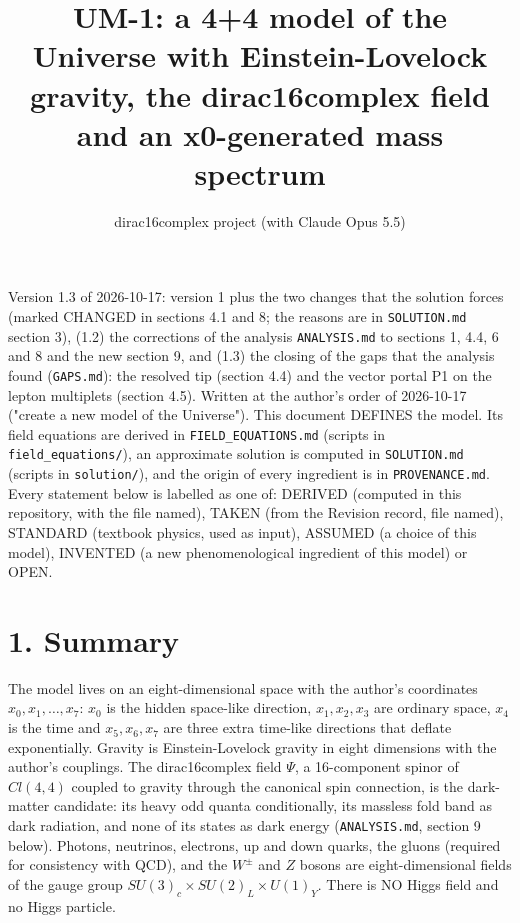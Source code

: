 \documentclass[11pt]{article}
\title{UM-1: a 4+4 model of the Universe with Einstein-Lovelock gravity, the dirac16complex field and an x0-generated mass spectrum}
\author{dirac16complex project (with Claude Opus 5.5)}
\date{}
\begin{document}
\maketitle
\tableofcontents
\newpage

Version 1.3 of 2026-10-17: version 1 plus the two changes that the solution forces (marked CHANGED in sections 4.1 and 8; the reasons are in \texttt{SOLUTION.\allowbreak{}md} section 3), (1.2) the corrections of the analysis \texttt{ANALYSIS.\allowbreak{}md} to sections 1, 4.4, 6 and 8 and the new section 9, and (1.3) the closing of the gaps that the analysis found (\texttt{GAPS.\allowbreak{}md}): the resolved tip (section 4.4) and the vector portal P1 on the lepton multiplets (section 4.5). Written at the author's order of 2026-10-17 ("create a new model of the Universe"). This document DEFINES the model. Its field equations are derived in \texttt{FIELD\_\allowbreak{}EQUATIONS.\allowbreak{}md} (scripts in \texttt{field\_\allowbreak{}equations/\allowbreak{}}), an approximate solution is computed in \texttt{SOLUTION.\allowbreak{}md} (scripts in \texttt{solution/\allowbreak{}}), and the origin of every ingredient is in \texttt{PROVENANCE.\allowbreak{}md}. Every statement below is labelled as one of: DERIVED (computed in this repository, with the file named), TAKEN (from the Revision record, file named), STANDARD (textbook physics, used as input), ASSUMED (a choice of this model), INVENTED (a new phenomenological ingredient of this model) or OPEN.

\section*{1. Summary}

The model lives on an eight-dimensional space with the author's coordinates $x_0, x_1, \dots, x_7$: $x_0$ is the hidden space-like direction, $x_1, x_2, x_3$ are ordinary space, $x_4$ is the time and $x_5, x_6, x_7$ are three extra time-like directions that deflate exponentially. Gravity is Einstein-Lovelock gravity in eight dimensions with the author's couplings. The dirac16complex field $\Psi$, a 16-component spinor of $Cl(4,4)$ coupled to gravity through the canonical spin connection, is the dark-matter candidate: its heavy odd quanta conditionally, its massless fold band as dark radiation, and none of its states as dark energy (\texttt{ANALYSIS.\allowbreak{}md}, section 9 below). Photons, neutrinos, electrons, up and down quarks, the gluons (required for consistency with QCD), and the $W^\pm$ and $Z$ bosons are eight-dimensional fields of the gauge group $SU(3)_c \times SU(2)_L \times U(1)_Y$. There is NO Higgs field and no Higgs particle.
\end{document}

